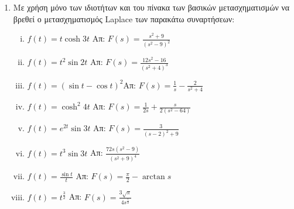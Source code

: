 




\geometry{left=15.63mm,right=15.63mm,top=28.25mm,bottom=34.25mm,
footskip=24.16mm,headsep=24.16mm}

\pagestyle{askhseis}
\everymath{\displaystyle}



\begin{center}
  \minibox{\large\bfseries \textcolor{Col1}{Ασκήσεις στο Μετασχηματισμό Laplace}}
\end{center}

\vspace{\baselineskip}

\begin{enumerate}

  \item Με χρήση μόνο των ιδιοτήτων και του πίνακα των βασικών μετασχηματισμών να 
    βρεθεί ο μετασχηματισμός Laplace των παρακάτω συναρτήσεων:
    \begin{enumerate}[i)]
      \item $ f(t) = t \cosh{3t} $ \hfill Απ: $ F(s) = \frac{s^{2}+9}{(s^{2}-9)^{2}} $ 
      \item $ f(t) = t^{2} \sin{2t} $ \hfill Απ: $F(s)=\frac{12s^{2}-16}{(s^{2}+4)^{3}}$
      \item $f(t)=(\sin t-\cos t)^2$\hfill Απ: $F(s)=\frac{1}{s}-\frac{2}{s^2+4}$
      \item $f(t)=\cosh^2 4t$ \hfill Απ: $F(s)=\frac{1}{2s}+\frac{s}{2(s^2-64)}$
      \item $f(t)=e^{2t}\sin 3t$ \hfill Απ: $F(s)=\frac{3}{(s-2)^2+9}$
      \item $f(t)=t^3\sin 3t$ \hfill Απ: $\frac{72s(s^2-9)}{(s^2+9)^4}$
      \item $ f(t) = \frac{\sin{t}}{t} $ \hfill Απ: $ F(s) = \frac{\pi}{2} - \arctan s $ 
      \item $ f(t) = t^{\frac{3}{2}} $ 
        \hfill Απ: $ F(s) = \frac{3 \sqrt{\pi}}{4s^{\frac{5}{2}}} $ 
    \end{enumerate}


\end{enumerate}
